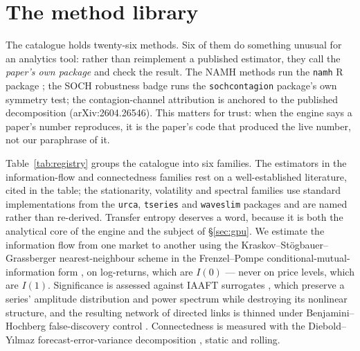 \documentclass[11pt]{article}
\newcommand{\code}[1]{\texttt{\small #1}}
\begin{document}
\section{The method library}
\label{sec:methods}
The catalogue holds twenty-six methods. Six of them do something unusual for an
analytics tool: rather than reimplement a published estimator, they call the
\emph{paper's own package} and check the result. The NAMH methods run the
\code{namh} R package \cite{namh2026}; the SOCH robustness badge runs the
\code{sochcontagion} package's own symmetry test; the contagion-channel
attribution is anchored to the published decomposition (arXiv:2604.26546). This
matters for trust: when the engine says a paper's number reproduces, it is the
paper's code that produced the live number, not our paraphrase of it.

Table~\ref{tab:registry} groups the catalogue into six families. The estimators
in the information-flow and connectedness families rest on a well-established
literature, cited in the table; the stationarity, volatility and spectral
families use standard implementations from the \code{urca}, \code{tseries} and
\code{waveslim} packages and are named rather than re-derived. Transfer entropy
deserves a word, because it is both the analytical core of the engine and the
subject of \S\ref{sec:gpu}. We estimate the information flow from one market to
another \cite{schreiber2000} using the Kraskov--St\"ogbauer--Grassberger
nearest-neighbour scheme \cite{kraskov2004} in the Frenzel--Pompe
conditional-mutual-information form \cite{frenzel2007}, on log-returns, which are
$I(0)$ --- never on price levels, which are $I(1)$. Significance is assessed
against IAAFT surrogates \cite{schreiber1996}, which preserve a series'
amplitude distribution and power spectrum while destroying its nonlinear
structure, and the resulting network of directed links is thinned under
Benjamini--Hochberg false-discovery control \cite{benjamini1995}. Connectedness
is measured with the Diebold--Y\i lmaz forecast-error-variance decomposition
\cite{dieboldyilmaz2012}, static and rolling.
\end{document}
